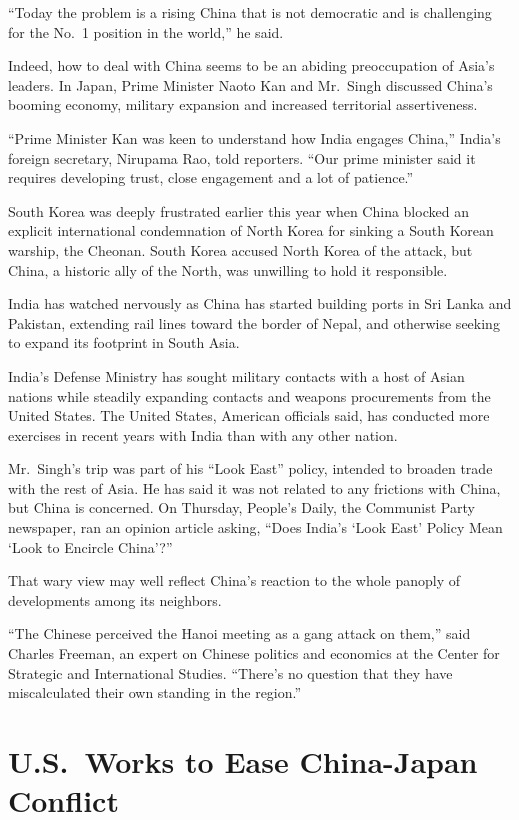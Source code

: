 ﻿\documentclass[12pt]{article}
\begin{document}
``Today the problem is a rising China that is not democratic and is challenging for the No.~1
position in the world,'' he said.

Indeed, how to deal with China seems to be an abiding preoccupation of Asia's leaders. In Japan,
Prime Minister Naoto Kan and Mr.~Singh discussed China's booming economy, military expansion and
increased territorial assertiveness.

``Prime Minister Kan was keen to understand how India engages China,'' India's foreign secretary,
Nirupama Rao, told reporters. ``Our prime minister said it requires developing trust, close
engagement and a lot of patience.''

South Korea was deeply frustrated earlier this year when China blocked an explicit international
condemnation of North Korea for sinking a South Korean warship, the Cheonan. South Korea accused
North Korea of the attack, but China, a historic ally of the North, was unwilling to hold it
responsible.

India has watched nervously as China has started building ports in Sri Lanka and Pakistan, extending
rail lines toward the border of Nepal, and otherwise seeking to expand its footprint in South Asia.

India's Defense Ministry has sought military contacts with a host of Asian nations while steadily
expanding contacts and weapons procurements from the United States. The United States, American
officials said, has conducted more exercises in recent years with India than with any other nation.

Mr.~Singh's trip was part of his ``Look East'' policy, intended to broaden trade with the rest of
Asia. He has said it was not related to any frictions with China, but China is concerned. On
Thursday, People's Daily, the Communist Party newspaper, ran an opinion article asking, ``Does
India's `Look East' Policy Mean `Look to Encircle China'?''

That wary view may well reflect China's reaction to the whole panoply of developments among its
neighbors.

``The Chinese perceived the Hanoi meeting as a gang attack on them,'' said Charles Freeman, an
expert on Chinese politics and economics at the Center for Strategic and International Studies.
``There's no question that they have miscalculated their own standing in the region.''

\section{U.S.~Works to Ease China-Japan Conflict}
\end{document}
